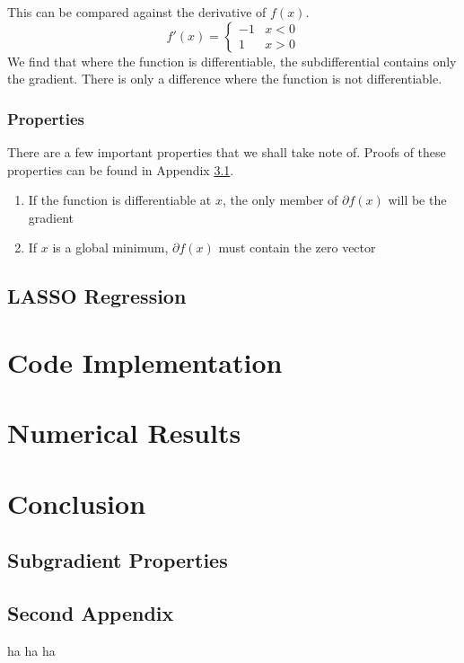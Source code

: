 \documentclass[conference]{IEEEtran}
\begin{document}
This can be compared against the derivative of \(f(x)\).
\begin{equation}\label{eq:abs derivative}
f'(x) = \begin{cases}
            -1 & x < 0\\
            1 & x > 0
\end{cases}
\end{equation}
We find that where the function is differentiable, the subdifferential contains only the gradient. There is only a difference where the function is not differentiable.

\subsubsection{Properties}
There are a few important properties that we shall take note of. Proofs of these properties can be found in Appendix \ref{sec:subgradient properties proofs}.
\begin{enumerate}
    \item If the function is differentiable at \(x\), the only member of \(\partial f(x)\) will be the gradient
    \item If \(x\) is a global minimum, \(\partial f(x)\) must contain the zero vector
\end{enumerate}


\subsection{LASSO Regression}\label{sec:math lasso}

\section{Code Implementation}\label{sec:code}

\section{Numerical Results}\label{sec:results}

\section{Conclusion}\label{sec:conclusion}

\appendix
\subsection{Subgradient Properties}\label{sec:subgradient properties proofs}
\subsubsection{}

\subsection{Second Appendix}
ha ha ha



\end{document}
